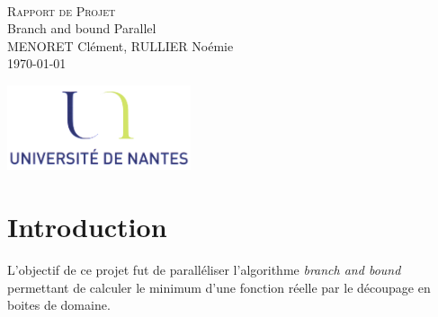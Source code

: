 \documentclass[a4paper,10pt]{article}
\begin{document}
\fancyhead[LE,CE,RE,LO,CO,RO]{}
\fancyfoot[LE,CE,RE,LO,CO,RO]{}
\renewcommand{\headrulewidth}{0.4pt}
\renewcommand{\footrulewidth}{0.4pt}

\begin{titlepage}

\vspace*{\fill}~
\begin{center}
{\large \textsc{Rapport de Projet}} \\
\vspace{1cm}
{\LARGE Branch and bound Parallel} \\
\vspace{1cm}
MENORET Clément, RULLIER Noémie \\
\today
\end{center}
\vspace*{\fill}

\begin{center}
\noindent 
\includegraphics[height=2.5cm]{Images/universite.png}
\end{center}
\pagebreak
\end{titlepage}

\newpage
\tableofcontents  

\newpage
\pagestyle{fancy}

\section{Introduction}
L'objectif de ce projet fut de paralléliser l'algorithme \emph{branch and bound} permettant de calculer le minimum d'une fonction réelle par le découpage en boites de domaine.
\end{document}
